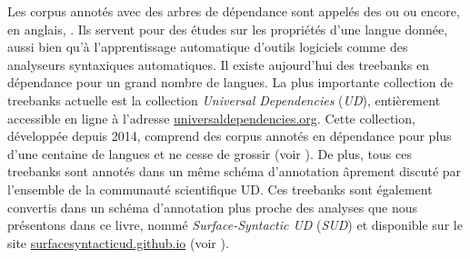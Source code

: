 {    Les corpus annotés avec des arbres de dépendance sont appelés des  ou  ou encore, en anglais, . Ils servent pour des études sur les propriétés d’une langue donnée, aussi bien qu’à l’apprentissage automatique d’outils logiciels comme des analyseurs syntaxiques automatiques. Il existe aujourd'hui des treebanks en dépendance pour un grand nombre de langues. La plus importante collection de treebanks actuelle est la collection \textit{Universal Dependencies} (\textit{UD}), entièrement accessible en ligne à l'adresse \url{universaldependencies.org}. Cette collection, développée depuis 2014, comprend des corpus annotés en dépendance pour plus d'une centaine de langues et ne cesse de grossir (voir \citealt{nivre2016universal}). De plus, tous ces treebanks sont annotés dans un même schéma d'annotation âprement discuté par l'ensemble de la communauté scientifique UD. Ces treebanks sont également convertis dans un schéma d'annotation plus proche des analyses que nous présentons dans ce livre, nommé \textit{Surface-Syntactic UD} (\textit{SUD}) et disponible sur le site \url{surfacesyntacticud.github.io} (voir \citealt{gerdes2018sud}).
}
